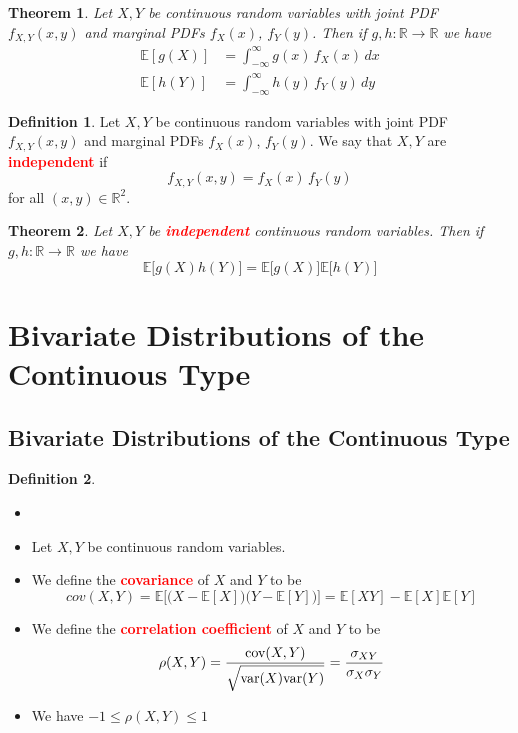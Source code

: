 \documentclass{article}
\newcommand{\R}{\mathbb{R}}
\newcommand{\E}{\mathbb{E}}
\newcommand{\var}{\text{var}}
\newcommand{\cov}{\text{cov}}
\newcommand{\bfred}[1]{\textcolor{red}{\textbf{#1}}}
\theoremstyle{plain}
\newtheorem{thm}{Theorem}[section]
\theoremstyle{definition}
\newtheorem{defn}{Definition}[section]
\theoremstyle{remark}
\begin{document}
\begin{thm}
    Let $X,Y$ be continuous random variables with joint PDF $f_{X,Y}(x,y)$ and marginal PDFs $f_X(x)$, $f_Y(y)$. Then if $g,h:\R\rightarrow\R$ we have
    \begin{align*}
        \E[g(X)] &= \int_{-\infty}^{\infty}g(x)\,f_X(x)\,dx \\
        \E[h(Y)] &= \int_{-\infty}^{\infty}h(y)\,f_Y(y)\,dy
    \end{align*}
\end{thm}

\begin{defn}
    Let $X,Y$ be continuous random variables with joint PDF $f_{X,Y}(x,y)$ and marginal PDFs $f_X(x)$, $f_Y(y)$. We say that $X,Y$ are \bfred{independent} if \[f_{X,Y}(x,y)=f_X(x)\,f_Y(y)\] for all $(x,y)\in\R^2$.
\end{defn}

\begin{thm}
    Let $X,Y$ be \bfred{independent} continuous random variables. Then if $g,h:\R\rightarrow\R$ we have \[\E\bigr[g(X)h(Y)\bigr]=\E\bigr[g(X)\bigr]\E\bigr[h(Y)\bigr]\]
\end{thm}

\section{Bivariate Distributions of the Continuous Type}

\subsection{Bivariate Distributions of the Continuous Type}

\begin{defn}
    \begin{itemize}
        \item[]
        \item Let $X,Y$ be continuous random variables.
        \item We define the \bfred{covariance} of $X$ and $Y$ to be \[cov(X,Y)=\E\bigr[\bigr(X-\E[X]\bigr)(Y-\E[Y]\bigr)\bigr]=\E[XY]-\E[X]\E[Y]\]
        \item We define the \bfred{correlation coefficient} of $X$ and $Y$ to be \[\rho(X,Y)=\frac{\cov(X,Y)}{\sqrt{\var(X)\var(Y)\vphantom{\bigr\vert}}} = \frac{\sigma_{XY}}{\sigma_X\sigma_Y}\]
        \item We have $-1\leq\rho(X,Y)\leq1$
    \end{itemize}
\end{defn}
\end{document}
